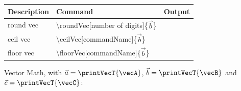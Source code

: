 \documentclass[10pt, a4paper]{article}
\begin{document}
\begin{center}
    \begin{tabular}{ l l c }
        Description & Command & Output\\ \hline
        round vec & \textbackslash roundVec[number of digits]\{\(\vec{b}\)\} & \printVec{\roundVecResult}\\
        ceil vec & \textbackslash ceilVec[commandName]\{\(\vec{b}\)\} & \printVec{\ceilVecResult}\\
        floor vec & \textbackslash floorVec[commandName]\{\(\vec{b}\)\} & \printVec{\floorVecResult}\\
    \end{tabular}
\end{center}

Vector Math, with \(\vec{a} = \printVecT{\vecA}\), \(\vec{b} = \printVecT{\vecB}\) and \(\vec{c} = \printVecT{\vecC}\):

\addVec[addVecResult]{\vecA, \vecB, \vecC}
\subVec[subVecResult]{\vecA, \vecB, \vecC}
\scaleVec[scaleVecResultA]{\vecA}{\scalarA}
\mulVec[mulVecResultA]{\vecA}{\vecB}
\mulVec[mulVecResultB]{\vecA}{\vecB, \vecC}
\divVVec[divVecResultA]{\vecA}{\vecB}
\divVVec[divVecResultB]{\vecA}{\vecB, \vecC}
\scaleAndAddVec{\vecA}{\vecB}{\scalarT}
\end{document}
